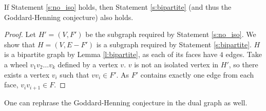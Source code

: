 \begin{claim}
  If Statement \ref{s:no_iso} holds, then Statement \ref{s:bipartite} (and thus
  the Goddard-Henning conjecture) also holds.
\end{claim}
\begin{proof}
  Let $H' = (V, F')$ be the subgraph required by Statement \ref{s:no_iso}.
  We show that $H = (V, E - F')$ is a subgraph required by Statement \ref{s:bipartite}.
  $H$ is a bipartite graph by Lemma \ref{l:bipartite}, as each of its faces have $4$ edges.
  Take a wheel $v_1v_2\dots v_k$ defined by a vertex $v$. $v$ is not an isolated vertex in $H'$, so
  there exists a vertex $v_i$ such that $vv_i \in F'$. As $F'$ contains exactly one edge
  from each face, $v_iv_{i + 1} \in F$.
\end{proof}

One can rephrase the Goddard-Henning conjecture in the dual graph as well.

